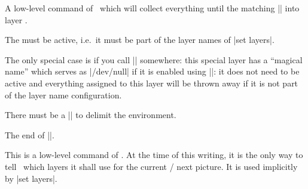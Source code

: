 \begin{command}{\pgfonlayer{}}
    A low-level command of \PGF\ which will collect everything until the matching |\endpgfonlayer| into layer .

    The  must be active, i.e.\ it must be part of the layer names of |set layers|. 
    
    The only special case is if you call || somewhere: this special layer has a ``magical name'' which serves as |/dev/null| if it is enabled using ||: it does not need to be active and everything assigned to this layer will be thrown away if it is not part of the layer name configuration.

    There must be a |\endpgfonlayer| to delimit the environment.
\end{command}
\begin{command}{\endpgfonlayer}
    The end of |\pgfonlayer|.
\end{command}


\begin{command}{\pgfsetlayers{}}
	This is a low-level command of \PGF. At the time of this writing, it is the only way to tell \PGF\ which layers it shall use for the current / next picture. It is used implicitly by |set layers|.
\end{command}
